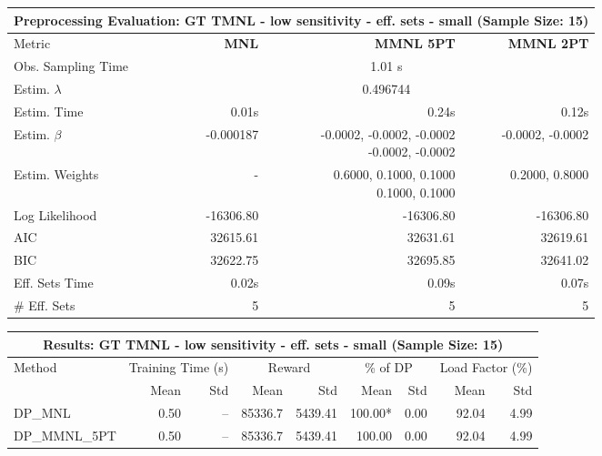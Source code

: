 
\begin{samepage}
\begin{center}
  \small
  \begin{tabular}{l|r|r|r}
    \toprule
    \multicolumn{4}{c}{\textbf{Preprocessing Evaluation: GT TMNL - low sensitivity - eff. sets - small (Sample Size: 15)}} \\
    \midrule
    Metric & \textbf{MNL} & \textbf{MMNL 5PT} & \textbf{MMNL 2PT} \\
    \midrule
    Obs. Sampling Time & \multicolumn{3}{c}{1.01 s} \\
    Estim. $\lambda$ & \multicolumn{3}{c}{0.496744} \\
    Estim. Time & 0.01s & 0.24s & 0.12s \\
    Estim. $\beta$ & -0.000187 & \makecell[tr]{-0.0002, -0.0002, -0.0002 \\ -0.0002, -0.0002} & -0.0002, -0.0002 \\
    Estim. Weights & - & \makecell[tr]{0.6000, 0.1000, 0.1000 \\ 0.1000, 0.1000} & 0.2000, 0.8000 \\
    Log Likelihood & -16306.80 & -16306.80 & -16306.80 \\
    AIC & 32615.61 & 32631.61 & 32619.61 \\
    BIC & 32622.75 & 32695.85 & 32641.02 \\
    Eff. Sets Time & 0.02s & 0.09s & 0.07s \\
    \# Eff. Sets & 5 & 5 & 5 \\
    \bottomrule
  \end{tabular}
\end{center}
\begin{center}
  \small
  \begin{tabular}{l|rr|rr|rr|rr}
    \toprule
    \multicolumn{9}{c}{\textbf{Results: GT TMNL - low sensitivity - eff. sets - small (Sample Size: 15)}} \\
    \midrule
    Method & \multicolumn{2}{c|}{Training Time (s)} & \multicolumn{2}{c|}{Reward} & \multicolumn{2}{c|}{\% of DP} & \multicolumn{2}{c}{Load Factor (\%)} \\
    & Mean & Std & Mean & Std & Mean & Std & Mean & Std \\
    \midrule
    DP\_MNL      &     0.50 &    -- &    85336.7 &    5439.41 & 100.00* &    0.00 &   92.04 &    4.99 \\
    DP\_MMNL\_5PT &     0.50 &    -- &    85336.7 &    5439.41 &  100.00 &    0.00 &   92.04 &    4.99 \\

\end{tabular}
\end{center}
\end{samepage}
